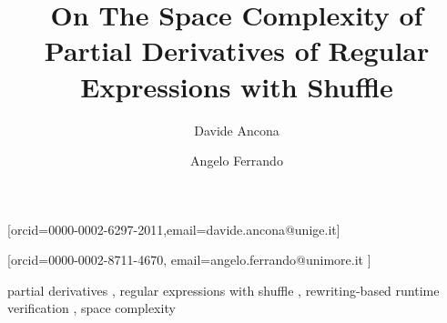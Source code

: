 \documentclass{ceurart}
\begin{document}

%
\title{On The Space Complexity of Partial Derivatives of Regular Expressions with Shuffle}

\author[1]{Davide Ancona}[orcid=0000-0002-6297-2011,email=davide.ancona@unige.it]

\cormark[1]

\address[1]{University of Genova, Italy}

\author[2]{Angelo Ferrando}[orcid=0000-0002-8711-4670,
 email=angelo.ferrando@unimore.it
]

\address[2]{University of Modena and Reggio Emilia, Italy}



\begin{keywords}
 partial derivatives \sep
 regular expressions with shuffle \sep
 rewriting-based runtime verification \sep
 space complexity
\end{keywords}
\end{document}
